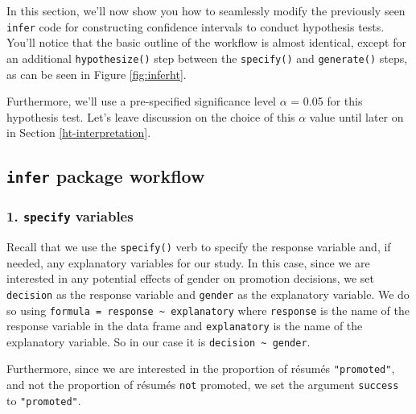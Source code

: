 \documentclass[
]{book}
\newenvironment{Shaded}{\begin{snugshade}}{\end{snugshade}}
\newcommand{\DataTypeTok}[1]{\textcolor[rgb]{0.13,0.29,0.53}{#1}}
\newcommand{\KeywordTok}[1]{\textcolor[rgb]{0.13,0.29,0.53}{\textbf{#1}}}
\newcommand{\NormalTok}[1]{#1}
\newcommand{\OperatorTok}[1]{\textcolor[rgb]{0.81,0.36,0.00}{\textbf{#1}}}
\newcommand{\StringTok}[1]{\textcolor[rgb]{0.31,0.60,0.02}{#1}}
\begin{document}
In this section, we'll now show you how to seamlessly modify the previously seen \texttt{infer} code for constructing confidence intervals to conduct hypothesis tests. You'll notice that the basic outline of the workflow is almost identical, except for an additional \texttt{hypothesize()} step between the \texttt{specify()} and \texttt{generate()} steps, as can be seen in Figure \ref{fig:inferht}.

Furthermore, we'll use a pre-specified significance level \(\alpha\) = 0.05 for this hypothesis test. Let's leave discussion on the choice of this \(\alpha\) value until later on in Section \ref{ht-interpretation}.

\hypertarget{infer-workflow-ht}{%
\subsection{\texorpdfstring{\texttt{infer} package workflow}{infer package workflow}}\label{infer-workflow-ht}}

\hypertarget{specify-variables}{%
\subsubsection*{\texorpdfstring{1. \texttt{specify} variables}{1. specify variables}}\label{specify-variables}}

Recall that we use the \texttt{specify()}  verb to specify the response variable and, if needed, any explanatory variables for our study. In this case, since we are interested in any potential effects of gender on promotion decisions, we set \texttt{decision} as the response variable and \texttt{gender} as the explanatory variable. We do so using \texttt{formula\ =\ response\ \textasciitilde{}\ explanatory} where \texttt{response} is the name of the response variable in the data frame and \texttt{explanatory} is the name of the explanatory variable. So in our case it is \texttt{decision\ \textasciitilde{}\ gender}.

Furthermore, since we are interested in the proportion of résumés \texttt{"promoted"}, and not the proportion of résumés \texttt{not} promoted, we set the argument \texttt{success} to \texttt{"promoted"}.

\begin{Shaded}
\end{Shaded}
\end{document}
